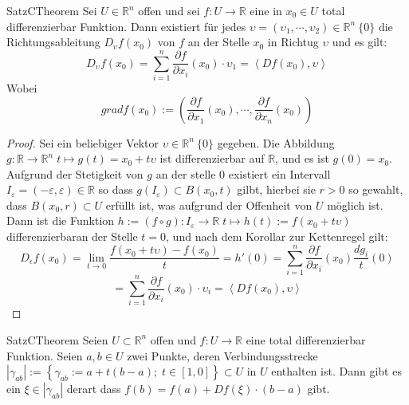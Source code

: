 \begin{ibox}[36]{Satz}{CTheorem}
    Sei $ U \in \mathbb{R}^n  $ offen und sei $ f: U \to \mathbb{R}  $ eine in $ x_0 \in U $ total differenzierbar
	Funktion. Dann existiert für jedes $ \upsilon =  \left( \upsilon_1 , \cdots, \upsilon_2 \right) \in \mathbb{R}^n \ \{0\} $ 
	die Richtungsableitung $ D_{\upsilon}f(x_0) $ von $ f $ an der Stelle $ x_0 $ in Richtug $ \upsilon$ und es gilt:
	$$ D_{\upsilon}f(x_0) = \sum_{i=1}^{n} \frac{\partial f}{\partial x_{i}} (x_0) \cdot \upsilon_1  =
	\left<Df(x_0), \upsilon \right>$$
	Wobei
	$$ grad f(x_0) := \left( \frac{\partial f}{\partial x_1} (x_0)  , \cdots, \frac{\partial f}{\partial x_n} (x_0) \right)$$
\end{ibox}
\begin{proof}
	Sei ein beliebiger Vektor $ \upsilon \in \mathbb{R}^n \ \{0\} $ gegeben. Die Abbildung $ g: \mathbb{R}  \to \mathbb{R}^n 
	 \; t \mapsto g(t) = x_0 + t \upsilon$  ist differenzierbar auf $ \mathbb{R}  $, und es ist $ g(0) = x_0 $. 
	 Aufgrund der Stetigkeit von $ g $ an der stelle $ 0 $ existiert ein Intervall $ I_{\varepsilon} = \left( - \varepsilon 
	 , \varepsilon \right) \in \mathbb{R}  $ so dass $ g \left( I_{ \varepsilon } \right) \subset  B(x_0,t) $ gilbt, hierbei
	 sie $ r > 0 $ so gewahlt, dass $ B(x_0, r) \subset U $ erfüllt ist, was aufgrund der Offenheit von $ U $ möglich ist.
	 Dann ist die Funktion $ h:=(f \circ g): I_{ \varepsilon } \to \mathbb{R} \; t \mapsto h(t) := f(x_0+t \upsilon) $ 
	 differenzierbaran der Stelle $ t = 0 $, und nach dem Korollar zur Kettenregel gilt:
	 $$ D_{\epsilon}f(x_0) = \lim_{t \to 0} \frac{f(x_0+t \upsilon) - f(x_0)}{t} = h'(0) = 
	 \sum_{i = 1}^{n} \frac{\partial f}{\partial x_{i}} (x_0) \frac{dg_{i}}{t}(0) 
	 $$
	  $$ = \sum_{i=1}^{n} \frac{\partial f}{\partial x_{i}} (x_0) \cdot \upsilon_{i} = \left<Df(x_0), \upsilon \right> $$
	   
\end{proof}
\begin{ibox}[37]{Satz}{CTheorem}
    Seien $ U \subset  \mathbb{R}^n  $ offen und $ f: U \to \mathbb{R}  $ eine total differenzierbar Funktion. Seien $ a,b \in U $
	zwei Punkte, deren Verbindungsstrecke $ \left| \gamma_{ab} \right| := \left\{ \gamma_{ab} := a + t(b-a); \; 
	t \in [1,0] \right\} \subset  U \text{ in } U $ enthalten ist. Dann gibt es ein $ \xi \in \left| \gamma_{ab} \right|  $ 
	derart dass $ f(b) = f(a)+ Df(\xi) \cdot (b-a)  $ gibt.
\end{ibox}
